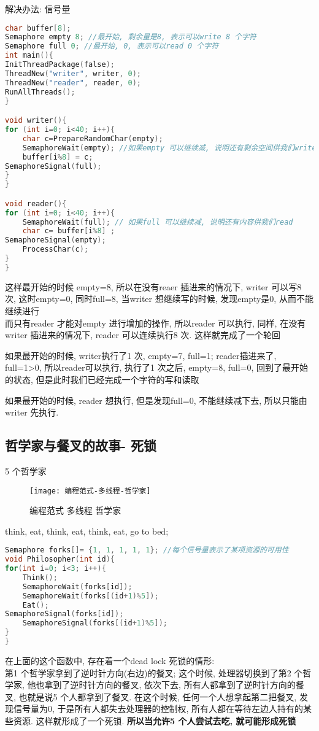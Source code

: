 \documentclass{article}
\begin{document}
解决办法: 信号量

\begin{lstlisting}[language = C]
char buffer[8];
Semaphore empty 8; //最开始, 剩余量是8, 表示可以write 8 个字符
Semaphore full 0; //最开始, 0, 表示可以read 0 个字符
int main(){
InitThreadPackage(false);
ThreadNew("writer", writer, 0);
ThreadNew("reader", reader, 0);
RunAllThreads();
}

void writer(){
for (int i=0; i<40; i++){
	char c=PrepareRandomChar(empty);
	SemaphoreWait(empty); //如果empty 可以继续减, 说明还有剩余空间供我们write
	buffer[i%8] = c;
SemaphoreSignal(full);
}
}

void reader(){
for (int i=0; i<40; i++){
	SemaphoreWait(full); // 如果full 可以继续减, 说明还有内容供我们read
	char c= buffer[i%8] ;
SemaphoreSignal(empty);
	ProcessChar(c);
}
}
\end{lstlisting}
这样最开始的时候 empty=8, 所以在没有reaer 插进来的情况下, writer 可以写8 次, 这时empty=0, 同时full=8, 当writer 想继续写的时候, 发现empty是0, 从而不能继续进行\\
而只有reader 才能对empty 进行增加的操作, 所以reader 可以执行, 同样, 在没有writer 插进来的情况下, reader 可以连续执行8 次. 这样就完成了一个轮回

如果最开始的时候, writer执行了1 次, empty=7, full=1; reader插进来了, full=1>0, 所以reader可以执行, 执行了1 次之后, empty=8, full=0, 回到了最开始的状态, 但是此时我们已经完成一个字符的写和读取

如果最开始的时候, reader 想执行, 但是发现full=0, 不能继续减下去, 所以只能由writer 先执行.

\subsection{哲学家与餐叉的故事- 死锁}
5 个哲学家
\begin{figure}[htbp]
	\centering
	\texttt{[image: 编程范式-多线程-哲学家]}\\
	\caption{编程范式 多线程 哲学家}\label{fig.编程范式.多线程.哲学家}
\end{figure}

think, eat, think, eat, think, eat, go to bed;
\begin{lstlisting}[language = C]
Semaphore forks[]= {1, 1, 1, 1, 1}; //每个信号量表示了某项资源的可用性
void Philosopher(int id){
for(int i=0; i<3; i++){
	Think();
	SemaphoreWait(forks[id]);
	SemaphoreWait(forks[(id+1)%5]);
	Eat();
SemaphoreSignal(forks[id]);
	SemaphoreSignal(forks[(id+1)%5]);
}
}
\end{lstlisting}
在上面的这个函数中, 存在着一个dead lock 死锁的情形:\\
第1 个哲学家拿到了逆时针方向(右边)的餐叉; 这个时候, 处理器切换到了第2 个哲学家, 他也拿到了逆时针方向的餐叉, 依次下去, 所有人都拿到了逆时针方向的餐叉, 也就是说5 个人都拿到了餐叉. 在这个时候, 任何一个人想拿起第二把餐叉, 发现信号量为0, 于是所有人都失去处理器的控制权, 所有人都在等待左边人持有的某些资源. 这样就形成了一个死锁.
\textbf{所以当允许5 个人尝试去吃, 就可能形成死锁}
\end{document}
